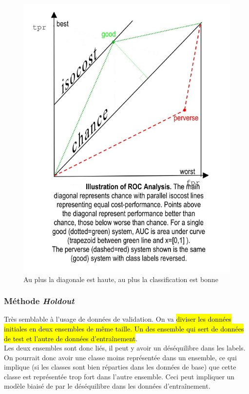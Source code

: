 \documentclass[letterpaper, 12pt]{article}
\newcommand{\alinea}{
\hspace*{0.5cm}}
\begin{document}
				\begin{minipage}{0.45\textwidth}
					\vspace*{-0.8cm}
					\begin{figure}[H]
						\centering
						\includegraphics[scale=0.5]{Images/ROC3.png}
						\caption{Au plus la diagonale est haute,
								 au plus la classification est
								 bonne}
						\label{fig:roc3}
					\end{figure}\noindent
				\end{minipage}\noindent
			\subsubsection{Méthode \textit{Holdout}}
				\alinea Très semblable à l'usage de données de validation.
					On va \hl{diviser les données initiales en deux 
					ensembles de même taille. Un des ensemble qui sert 
					de données de test et l'autre de données d'entraînement}.
					\\
				\alinea Les deux ensembles sont donc liés, il peut y avoir 
					un déséquilibre dans les labels. On pourrait donc
					avoir une classe moins représentée dans un ensemble,
					ce qui implique (si les classes sont bien réparties
					dans les données de base) que cette classe est représentée
					trop fort dans l'autre ensemble. Ceci peut impliquer
					un modèle biaisé de par le déséquilibre dans les données
					d'entraînement.
\end{document}

